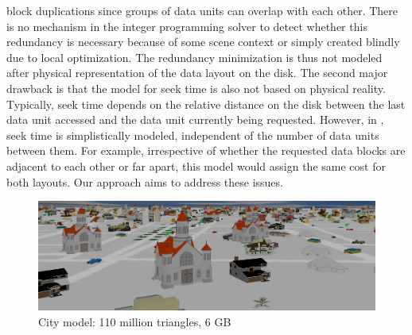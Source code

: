 block duplications since groups of data units can overlap with each other. There is no mechanism in the integer programming solver to detect whether this redundancy is necessary because of some scene context or simply created blindly due to local optimization. The redundancy minimization is thus not modeled after
physical representation of the data layout on the disk. The second major
drawback is that the model for seek time is also not based on physical reality.
Typically, seek time depends on the relative distance on the disk between the
last data unit accessed and the data unit currently being requested. However,
in \cite{optimizingredundancy}, seek time is simplistically modeled,
independent of the number of data units between them. For example,
irrespective of whether the requested data blocks are adjacent to
each other or far apart, this model would assign the same cost for both
layouts. Our approach
aims to address these issues. 


\begin{figure}[t]
  \centering
  \includegraphics[width=\columnwidth]{city.png}
  \caption{City model: 110 million triangles, 6 GB }
  \label{fig:model1}
\end{figure}


